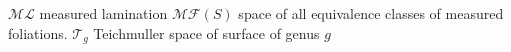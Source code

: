$\mathcal{ML}$ measured lamination
$\mathcal{MF}(S)$ space of all equivalence classes of measured foliations.
$\mathcal{T}_g$ Teichmuller space of surface of genus $g$
\cite{ref}
